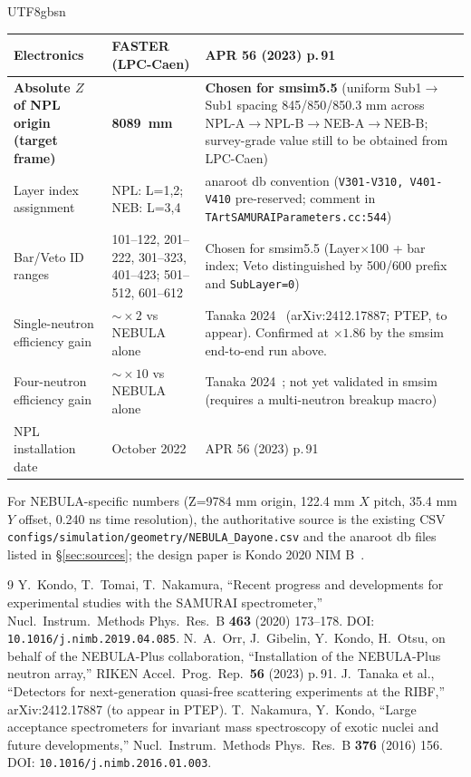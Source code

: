 \documentclass[11pt,a4paper]{article}
\newcommand{\NEB}{NEBULA}
\newcommand{\NPL}{NEBULA-Plus}
\begin{document}
\begin{CJK}{UTF8}{gbsn}
\begin{table}[h]
\begin{tabular}{p{4.8cm}lp{6.5cm}}
Electronics
  & FASTER (LPC-Caen)
  & APR 56 (2023) p.\,91~\cite{aprApr2022}\\
\midrule
\textbf{Absolute $Z$ of NPL origin (target frame)}
  & \textbf{\SI{8089}{mm}}
  & \textbf{Chosen for smsim5.5} (uniform Sub1$\to$Sub1 spacing 845/850/850.3
        mm across NPL-A$\to$NPL-B$\to$NEB-A$\to$NEB-B; survey-grade value still
        to be obtained from LPC-Caen)\\
Layer index assignment
  & NPL: L=1,2; NEB: L=3,4
  & anaroot db convention (\texttt{V301-V310, V401-V410} pre-reserved;
        comment in \texttt{TArtSAMURAIParameters.cc:544})\\
Bar/Veto ID ranges
  & 101--122, 201--222, 301--323, 401--423; 501--512, 601--612
  & Chosen for smsim5.5 (Layer$\times$100 + bar index;
        Veto distinguished by 500/600 prefix and \texttt{SubLayer=0})\\
Single-neutron efficiency gain
  & $\sim\!\times 2$ vs \NEB{} alone
  & Tanaka 2024~\cite{tanaka2024} (arXiv:2412.17887; PTEP, to appear).
        Confirmed at $\times 1.86$ by the smsim end-to-end run above.\\
Four-neutron efficiency gain
  & $\sim\!\times 10$ vs \NEB{} alone
  & Tanaka 2024~\cite{tanaka2024}; not yet validated in smsim
        (requires a multi-neutron breakup macro)\\
NPL installation date
  & October 2022
  & APR 56 (2023) p.\,91~\cite{aprApr2022}\\
\bottomrule
\end{tabular}
\end{table}

For NEBULA-specific numbers (Z=9784 mm origin, 122.4 mm $X$ pitch, 35.4 mm
$Y$ offset, 0.240 ns time resolution), the authoritative source is the
existing CSV \texttt{configs/simulation/geometry/NEBULA\_Dayone.csv} and
the anaroot db files listed in \S\ref{sec:sources}; the design paper is
Kondo 2020 NIM B~\cite{kondo2020nim}.

\begin{thebibliography}{9}
 Y.~Kondo, T.~Tomai, T.~Nakamura,
``Recent progress and developments for experimental studies with the SAMURAI
spectrometer,'' Nucl.\ Instrum.\ Methods Phys.\ Res.\ B \textbf{463} (2020) 173--178.
DOI: \texttt{10.1016/j.nimb.2019.04.085}.
 N.~A.~Orr, J.~Gibelin, Y.~Kondo, H.~Otsu, on behalf of the
\NPL{} collaboration, ``Installation of the \NPL{} neutron array,'' RIKEN Accel.\
Prog.\ Rep.\ \textbf{56} (2023) p.\,91.
 J.~Tanaka et al., ``Detectors for next-generation
quasi-free scattering experiments at the RIBF,'' arXiv:2412.17887 (to appear in PTEP).
\bibitem{nakamura2016} T.~Nakamura, Y.~Kondo, ``Large acceptance spectrometers for
invariant mass spectroscopy of exotic nuclei and future developments,''
Nucl.\ Instrum.\ Methods Phys.\ Res.\ B \textbf{376} (2016) 156. DOI:
\texttt{10.1016/j.nimb.2016.01.003}.
\end{thebibliography}

\end{CJK}
\end{document}
